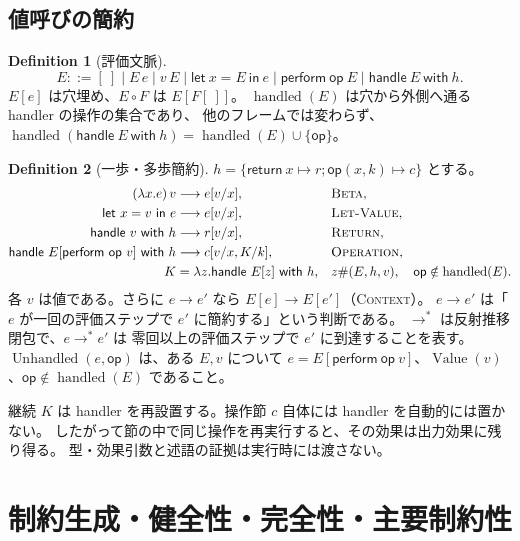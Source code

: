 \documentclass[a4paper,11pt]{article}
\theoremstyle{definition}
\newtheorem{definition}{Definition}[section]
\newcommand{\op}{\mathsf{op}}
\newcommand{\lete}[3]{\mathsf{let}\ #1=#2\ \mathsf{in}\ #3}
\newcommand{\perform}[2]{\mathsf{perform}\ #1\ #2}
\newcommand{\handle}[2]{\mathsf{handle}\ #1\ \mathsf{with}\ #2}
\newcommand{\Val}{\operatorname{Value}}
\newcommand{\Unhandled}{\operatorname{Unhandled}}
\newcommand{\Rule}[1]{\textsc{#1}}
\begin{document}
\subsection{値呼びの簡約}
\begin{definition}[評価文脈]
\[
 E::=[\ ]\mid E\,e\mid v\,E\mid\lete x E e
       \mid\perform\op E\mid\handle E h.
\]
$E[e]$ は穴埋め、$E\circ F$ は $E[F[\ ]]$。
$\operatorname{handled}(E)$ は穴から外側へ通る handler の操作の集合であり、
他のフレームでは変わらず、$\operatorname{handled}(\handle E h)
=\operatorname{handled}(E)\cup\{\op\}$。
\end{definition}
\begin{definition}[一歩・多歩簡約]
$h=\{\mathsf{return}\ x\mapsto r;\op(x,k)\mapsto c\}$ とする。
\begin{align*}
 (\lambda x.e)\,v&\longrightarrow e[v/x],& &\Rule{Beta},\\
 \lete x v e&\longrightarrow e[v/x],& &\Rule{Let-Value},\\
 \handle v h&\longrightarrow r[v/x],& &\Rule{Return},\\
 \handle{E[\perform\op v]}h
 &\longrightarrow c[v/x,K/k],& &\Rule{Operation},\\
 K&=\lambda z.\handle{E[z]}h,
 & &z\#(E,h,v),\quad\op\notin\operatorname{handled}(E).
\end{align*}
各 $v$ は値である。さらに $e\longrightarrow e'$ なら
$E[e]\longrightarrow E[e']$（\Rule{Context}）。
$e\longrightarrow e'$ は「$e$ が一回の評価ステップで $e'$ に簡約する」という判断である。
$\longrightarrow^*$ は反射推移閉包で、$e\longrightarrow^*e'$ は
零回以上の評価ステップで $e'$ に到達することを表す。
$\Unhandled(e,\op)$ は、ある $E,v$ について
$e=E[\perform\op v]$、$\Val(v)$、$\op\notin\operatorname{handled}(E)$ であること。
\end{definition}
継続 $K$ は handler を再設置する。操作節 $c$ 自体には handler を自動的には置かない。
したがって節の中で同じ操作を再実行すると、その効果は出力効果に残り得る。
型・効果引数と述語の証拠は実行時には渡さない。

\section{制約生成・健全性・完全性・主要制約性}
\label{sec:inference}
\end{document}
